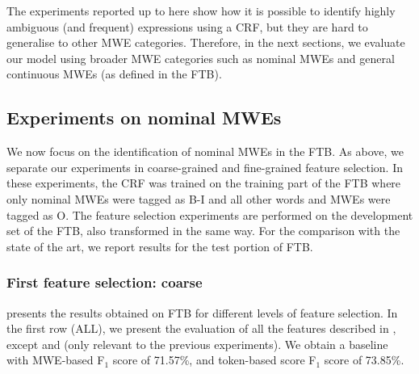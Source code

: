 \documentclass[output=paper,
modfonts
]{langscibook}
\begin{document}
The experiments reported up to here show how it is possible to identify highly ambiguous (and frequent) expressions using a CRF, but they are hard to generalise to other MWE categories. Therefore, in the next sections, we evaluate our model using broader MWE categories such as nominal MWEs and general continuous MWEs (as defined in the FTB).


\subsection{Experiments on nominal MWEs}
\label{schol:sec:results-nominal}

We now focus on the identification of nominal MWEs in the FTB. As above, we separate our experiments in coarse-grained and fine-grained feature selection. In these experiments, the CRF was trained on the training part of the FTB where only nominal MWEs were tagged as B-I and all other words and MWEs were tagged as O. The feature selection experiments are performed on the development set of the FTB, also transformed in the same way. %
For the comparison with the state of the art, we report results for the test portion of FTB.



\subsubsection{First feature selection: coarse}
\label{schol:sec:results-nominal-feat-coarse}
 presents the results obtained on FTB for different levels of feature selection. In the first row (ALL), we present the evaluation of all the features described in , except  and  (only relevant to the previous experiments). We obtain a baseline with MWE-based F$_1$ score of 71.57\%, and token-based score F$_1$ score of 73.85\%. 
\end{document}
